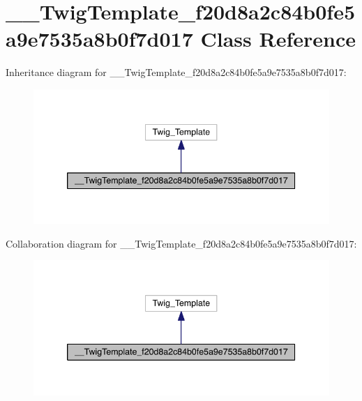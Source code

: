 \hypertarget{class_____twig_template__f20d8a2c84b0fe5a9e7535a8b0f7d017}{\section{\-\_\-\-\_\-\-Twig\-Template\-\_\-f20d8a2c84b0fe5a9e7535a8b0f7d017 Class Reference}
\label{class_____twig_template__f20d8a2c84b0fe5a9e7535a8b0f7d017}
}


Inheritance diagram for \-\_\-\-\_\-\-Twig\-Template\-\_\-f20d8a2c84b0fe5a9e7535a8b0f7d017\-:
\nopagebreak
\begin{figure}[H]
\begin{center}
\leavevmode
\includegraphics[width=342pt]{class_____twig_template__f20d8a2c84b0fe5a9e7535a8b0f7d017__inherit__graph}
\end{center}
\end{figure}


Collaboration diagram for \-\_\-\-\_\-\-Twig\-Template\-\_\-f20d8a2c84b0fe5a9e7535a8b0f7d017\-:
\nopagebreak
\begin{figure}[H]
\begin{center}
\leavevmode
\includegraphics[width=342pt]{class_____twig_template__f20d8a2c84b0fe5a9e7535a8b0f7d017__coll__graph}
\end{center}
\end{figure}
